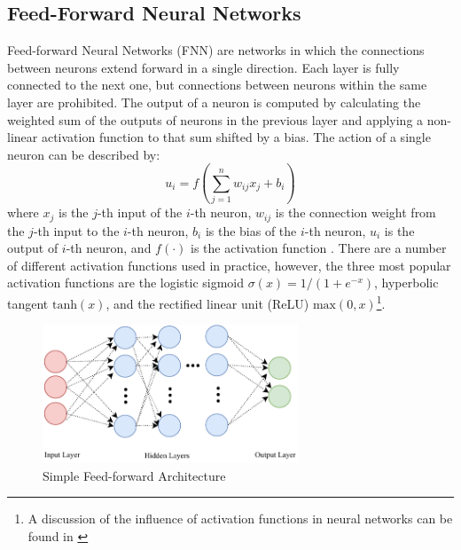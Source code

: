 \documentclass[10pt,conference]{IEEEtran}
\begin{document}
\subsection{Feed-Forward Neural Networks}
Feed-forward Neural Networks (FNN) are networks in which the connections between neurons extend forward in a single direction. Each layer is fully connected to the next one, but connections between neurons within the same layer are prohibited. The output of a neuron is computed by calculating the weighted sum of the outputs of neurons in the previous layer and applying a non-linear activation function to that sum shifted by a bias. The action of a single neuron can be described by:
\begin{equation}
u_i=f(\sum_{j=1}^{n} w_{ij}x_j+b_i)
\end{equation}
where $x_j$ is the $j$-th input of the $i$-th neuron, $w_{ij}$ is the connection weight from the $j$-th input to the $i$-th neuron, $b_i$ is the bias of the $i$-th neuron, $u_i$ is the output of $i$-th neuron, and $f(\cdot)$ is the activation function \cite{WeimingReachability2018}.
There are a number of different activation functions used in practice, however, the three most popular activation functions are the logistic sigmoid $\sigma(x)=1/(1+e^{-x})$, hyperbolic tangent $\textrm{tanh}(x)$, and the rectified linear unit (ReLU) $\textrm{max}(0,x)$\footnote{A discussion of the influence of activation functions in neural networks can be found in \cite{GlorotTraining2010}}.
\begin{figure}[!h]
\centering
\includegraphics[width=3.0in]{NeuralNetworkFNN.pdf}
\caption{Simple Feed-forward Architecture}
\label{fig_FeedForwardNet}
\end{figure}
\end{document}
